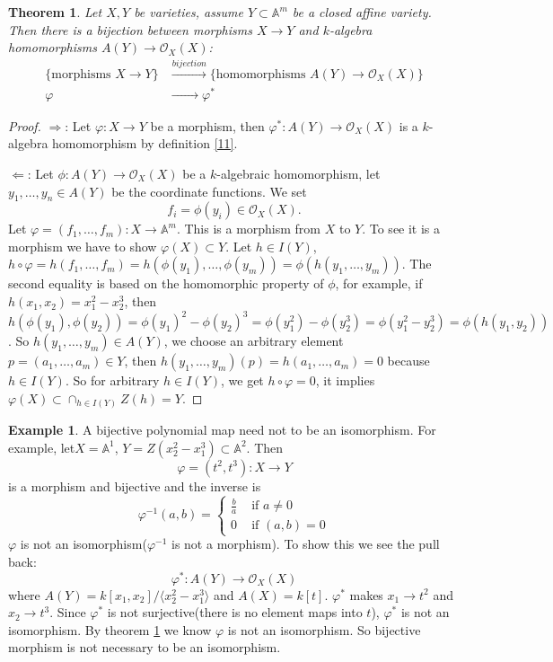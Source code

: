 \documentclass{amsart}
\theoremstyle{plain}
\newtheorem{theorem}{Theorem}
\theoremstyle{definition}
\newtheorem{example}{Example}
\theoremstyle{remark}
\numberwithin{equation}{section}
\begin{document}
\begin{theorem}\label{12}
	Let $ X,Y $ be varieties, assume $ Y\subset \mathbb{A}^m $ be a closed affine variety. Then there is a bijection between morphisms $ X\to Y $ and $ k $-algebra homomorphisms $ A(Y)\to \mathcal{O}_X(X) $:
\begin{align*}
	\{ \text{morphisms } X\to Y \} & \xrightarrow{bijection}\{ \text{homomorphisms }A(Y)\to \mathcal{O}_X(X) \} \\
	\varphi & \xrightarrow{\qquad\quad}  \varphi^\ast
\end{align*}
\end{theorem}
\begin{proof}
	$ \Rightarrow $: Let $ \varphi :X\to Y $ be a morphism, then $ \varphi^\ast: A(Y)\to \mathcal{O}_X(X) $ is a $ k $-algebra homomorphism by definition \ref{11}.
	
	$ \Leftarrow $: Let $\phi:A(Y)\to \mathcal{O}_X(X)  $ be a $ k $-algebraic homomorphism, let $ y_1,\dots,y_n\in A(Y) $ be the coordinate functions. We set
	$$
	f_i=\phi(y_i)\in \mathcal{O}_X(X).
	$$
	Let $ \varphi=(f_1,\dots,f_m):X\to \mathbb{A}^m $.
	This is a morphism from $ X $ to $ Y $. To see it is a morphism we have to show $ \varphi(X)\subset Y $. Let $ h\in I(Y) $, $ h\circ \varphi =h(f_1,\dots,f_m)=h(\phi(y_1),\dots,\phi(y_m))=\phi (h(y_1,\dots,y_m)) $. The second equality is based on the homomorphic property of $ \phi $, for example, if $ h(x_1,x_2)=x_1^2-x_2^3 $, then $ h(\phi(y_1),\phi(y_2))=\phi(y_1)^2-\phi(y_2)^3= \phi(y_1^2)-\phi(y_2^3)=\phi(y_1^2-y_2^3)=\phi(h(y_1,y_2)) $. So $ h(y_1,\dots,y_m)\in A(Y) $, we choose an arbitrary element $ p=(a_1,\dots,a_m)\in Y $, then $ h(y_1,\dots,y_m)(p)=h(a_1,\dots,a_m)=0 $ because $ h\in I(Y) $. So for arbitrary $ h\in I(Y) $, we get $ h\circ\varphi=0 $, it implies $ \varphi(X)\subset \mathop{\cap}_{h\in I(Y)} Z(h)= Y $.
\end{proof}
\begin{example}
	A bijective polynomial map need not to be an isomorphism. For example, let$ X=\mathbb{A}^1 $, $ Y=Z(x_2^2-x_1^3) \subset \mathbb{A}^2 $. Then 
	$$
	\varphi=(t^2,t^3):X\to Y
	$$
	is a morphism and bijective and the inverse is 
	\begin{equation*}
		\varphi^{-1}(a,b)=\left\lbrace \begin{matrix}
		\frac{b}{a} & \text{ if } a\neq 0\\ 
		0 & \text{ if } (a,b)=0
		\end{matrix}\right.   
	\end{equation*}
	$ \varphi $ is not an isomorphism($ \varphi^{-1} $ is not a morphism). To show this we see the pull back:
	\begin{equation*}
		\varphi^\ast : A(Y)\to \mathcal{O}_X(X)
	\end{equation*}
	where $ A(Y)=k[x_1,x_2]/\langle x_2^2-x_1^3\rangle $ and $ A(X)=k[t] $. $ \varphi^\ast $ makes $ x_1\to t^2 $ and $ x_2\to t^3 $. Since $ \varphi^\ast $ is not surjective(there is no element maps into $ t $), $ \varphi^\ast $ is not an isomorphism. By theorem \ref{12} we know $ \varphi $ is not an isomorphism. So bijective morphism is not necessary to be an isomorphism.
\end{example}
\end{document}
